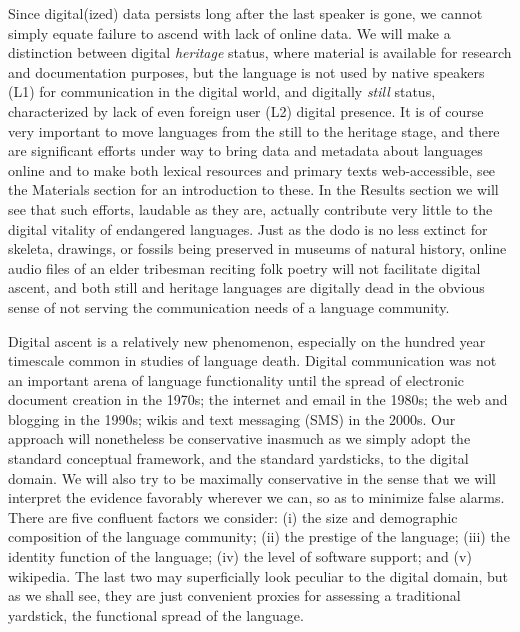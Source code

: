 \documentclass[10pt]{article}
\begin{document}
Since digital(ized) data persists long after the last speaker is gone, we
cannot simply equate {\color{black} failure to ascend} with lack of online
data. We will make a distinction between digital {\it heritage} status, where
material is available for research and documentation purposes, but the
language is not used by native speakers (L1) for communication in the digital
world, and digitally {\it {\color{black} still}} status, characterized by lack
of even foreign user (L2) digital presence. It is of course very important to
move languages from the {\color{black} still} to the heritage stage, and there
are significant efforts under way to bring data and metadata about languages
online and to make both lexical resources and primary texts web-accessible,
see the Materials section for an introduction to these.  In the Results
section we will see that such efforts, laudable as they are, actually
contribute very little to the digital vitality of endangered languages.  Just
as the dodo is no less extinct for skeleta, drawings, or fossils being
preserved in museums of natural history, online audio files of an elder
tribesman reciting folk poetry will not {\color{black} facilitate digital
  ascent, and both still and heritage languages are digitally dead in the
  obvious sense of not serving the communication needs of a language
  community.}




{\color{black} Digital ascent is a relatively new phenomenon,} especially on
the hundred year timescale common in studies of language death.  Digital
communication was not an important arena of language functionality until the
spread of electronic document creation in the 1970s; the internet and email in
the 1980s; the web and blogging in the 1990s; wikis and text messaging (SMS)
in the 2000s. Our approach will nonetheless be conservative inasmuch as we
simply adopt the standard conceptual framework, and the standard yardsticks,
to the digital domain. We will also try to be maximally conservative in the
sense that we will interpret the evidence favorably wherever we can, so as to
minimize false alarms.  There are five confluent factors we consider: (i) the
size and demographic composition of the language community; (ii) the prestige
of the language; (iii) the identity function of the language; (iv) the level
of software support; and (v) wikipedia. The last two may superficially look
peculiar to the digital domain, but as we shall see, they are just convenient
proxies for assessing a traditional yardstick, the functional spread of the
language.
\end{document}
